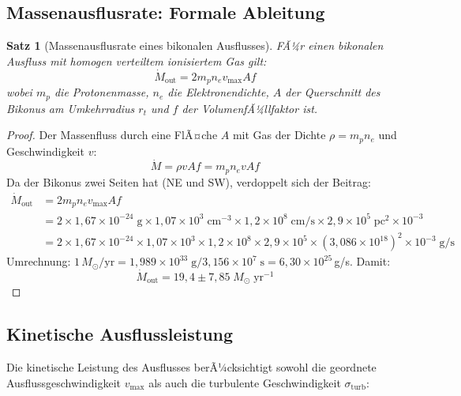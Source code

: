 ﻿\documentclass[12pt,a4paper]{report}
\newtheorem{theorem}{Satz}[chapter]
\begin{document}
\subsection{Massenausflusrate: Formale Ableitung}

\begin{theorem}[Massenausflusrate eines bikonalen Ausflusses]
	FÃ¼r einen bikonalen Ausfluss mit homogen verteiltem ionisiertem Gas gilt:
	\begin{equation}
		\dot{M}_\mathrm{out} = 2 m_p n_e v_\mathrm{max} A f
	\end{equation}
	wobei $m_p$ die Protonenmasse, $n_e$ die Elektronendichte, $A$ der Querschnitt des Bikonus am Umkehrradius $r_t$ und $f$ der VolumenfÃ¼llfaktor ist.
\end{theorem}

\begin{proof}
	Der Massenfluss durch eine FlÃ¤che $A$ mit Gas der Dichte $\rho = m_p n_e$ und Geschwindigkeit $v$:
	\begin{equation}
		\dot{M} = \rho v A f = m_p n_e v A f
	\end{equation}
	Da der Bikonus zwei Seiten hat (NE und SW), verdoppelt sich der Beitrag:
	\begin{align}
		\dot{M}_\mathrm{out} &= 2 m_p n_e v_\mathrm{max} A f \\
		&= 2 \times 1{,}67 \times 10^{-24}\;\text{g} \times 1{,}07 \times 10^3\;\text{cm}^{-3} \times 1{,}2 \times 10^8\;\text{cm/s} \times 2{,}9 \times 10^5\;\text{pc}^2 \times 10^{-3} \\
		&= 2 \times 1{,}67 \times 10^{-24} \times 1{,}07 \times 10^3 \times 1{,}2 \times 10^8 \times 2{,}9 \times 10^5 \times (3{,}086 \times 10^{18})^2 \times 10^{-3}\;\text{g/s}
	\end{align}
	Umrechnung: $1\,M_\odot/\text{yr} = 1{,}989 \times 10^{33}\;\text{g} / 3{,}156 \times 10^7\;\text{s} = 6{,}30 \times 10^{25}$\,g/s. Damit:
	\begin{equation}
		\dot{M}_\mathrm{out} = 19{,}4 \pm 7{,}85\;M_\odot\;\text{yr}^{-1}
	\end{equation}
\end{proof}

\subsection{Kinetische Ausflussleistung}

Die kinetische Leistung des Ausflusses berÃ¼cksichtigt sowohl die geordnete Ausfluss\-geschwindigkeit $v_\mathrm{max}$ als auch die turbulente Geschwindigkeit $\sigma_\mathrm{turb}$:
\end{document}
